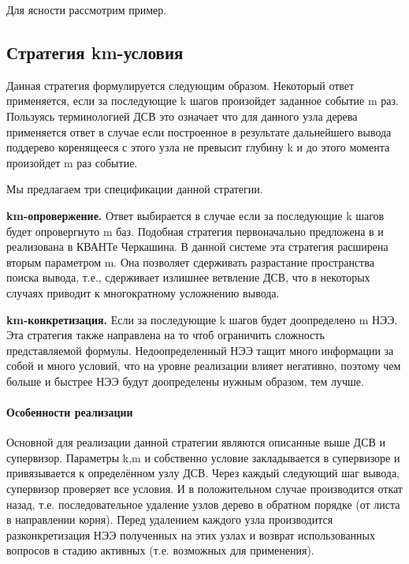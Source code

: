 Для ясности рассмотрим пример.



\subsection{Стратегия km-условия}
Данная стратегия формулируется следующим образом. Некоторый ответ применяется, если за последующие k шагов произойдет заданное событие m раз. Пользуясь терминологией ДСВ это означает что для данного узла дерева применяется ответ в случае если построенное в результате дальнейшего вывода поддерево коренящееся с этого узла не превысит глубину k и до этого момента произойдет m раз событие.

Мы предлагаем три спецификации данной стратегии.

\textbf{km-опровержение.} Ответ выбирается в случае если за последующие k шагов будет опровергнуто m баз. Подобная стратегия первоначально предложена в \cite{ICDS2000} и реализована в КВАНТе Черкашина. В данной системе эта стратегия расширена вторым параметром m. Она позволяет сдерживать разрастание пространства поиска вывода, т.е., сдерживает излишнее ветвление ДСВ, что в некоторых случаях приводит к многократному усложнению вывода.

\textbf{km-конкретизация.} Если за последующие k шагов будет доопределено m НЭЭ. Эта стратегия также направлена на то чтоб ограничить сложность представляемой формулы. Недоопределенный НЭЭ тащит много информации за собой и много условий, что на уровне реализации влияет негативно, поэтому чем больше и быстрее НЭЭ будут доопределены нужным образом, тем лучше.

\paragraph{Особенности реализации}
Основной для реализации данной стратегии являются описанные выше ДСВ и супервизор. Параметры k,m и собственно условие закладывается в супервизоре и привязывается к определённом узлу ДСВ. Через каждый следующий шаг вывода, супервизор проверяет все условия. И в положительном случае производится откат назад, т.е. последовательное удаление узлов дерево в обратном порядке (от листа в направлении корня). Перед удалением каждого узла производится разконкретизация НЭЭ полученных на этих узлах и возврат использованных вопросов в стадию активных (т.е. возможных для применения).

